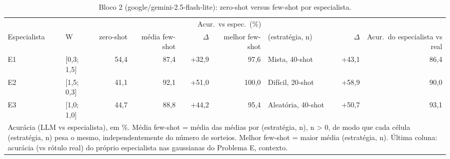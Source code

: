 \begin{table}[htbp]
\centering
\small
\caption{Bloco 2 (google/gemini-2.5-flash-lite): zero-shot versus few-shot por especialista.}
\label{tab:bloco2_E_zero_vs_fewshot_por_especialista_flashlite}
\begin{tabular}{llrrrrlrr}
\toprule
 &  & \multicolumn{6}{c}{Acur.\ vs espec.\ (\%)} &  \\ \cmidrule(lr){3-8}
Especialista & W & zero-shot & média few-shot & $\Delta$ & melhor few-shot & (estratégia, n) & $\Delta$ & Acur.\ do especialista vs real \\
\midrule
E1 & [0,3; 1,5] & 54,4 & 87,4 & +32,9 & 97,6 & Mista, 40-shot & +43,1 & 86,4 \\
E2 & [1,5; 0,3] & 41,1 & 92,1 & +51,0 & 100,0 & Difícil, 20-shot & +58,9 & 90,0 \\
E3 & [1,0; 1,0] & 44,7 & 88,8 & +44,2 & 95,4 & Aleatória, 40-shot & +50,7 & 93,1 \\
\bottomrule
\multicolumn{9}{p{0.95\linewidth}}{\footnotesize Acurácia (LLM vs especialista), em \%. Média few-shot = média das médias por (estratégia, n), n > 0, de modo que cada célula (estratégia, n) pesa o mesmo, independentemente do número de sorteios. Melhor few-shot = maior média (estratégia, n). Última coluna: acurácia (vs rótulo real) do próprio especialista nas gaussianas do Problema E, contexto.} \\
\end{tabular}
\end{table}
